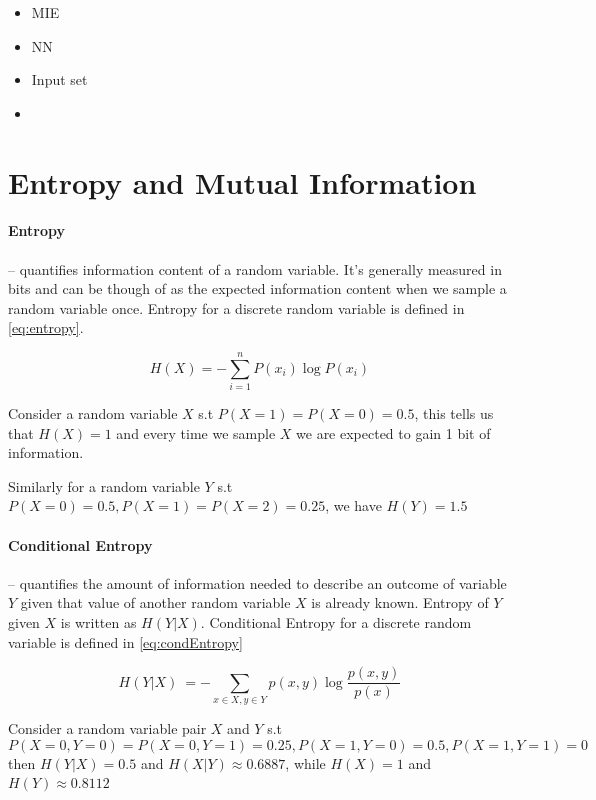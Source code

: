 
\begin{itemize}
  \item{
      MIE
    }
  \item{
      NN
    }
  \item{
      Input set 
    }
  \item{
    }
\end{itemize}

\section{Entropy and Mutual Information}

\paragraph{Entropy}-- quantifies information content of a random variable. It's
generally measured in bits and can be though of as the expected information
content when we sample a random variable once. Entropy for a discrete random
variable is defined in \autoref{eq:entropy}.

\begin{equation}
  H(X)=-\sum _{i=1}^{n}{P (x_{i})\log P(x_{i})}
\label{eq:entropy}
\end{equation}

Consider a random variable $X$ s.t $P(X=1) = P(X=0) = 0.5$, this tells
us that $H(X) = 1$ and every time we sample $X$ we are expected to gain 1 bit of
information.

Similarly for a random variable $Y$ s.t $P(X=0) = 0.5, P(X=1) = P(X=2) = 0.25$,
we have $H(Y) = 1.5$

\paragraph{Conditional Entropy}-- quantifies the amount of information needed to
describe an outcome of variable $Y$ given that value of another random variable
$X$ is already known. Entropy of $Y$ given $X$ is written as $H(Y|X)$.
Conditional Entropy for a discrete random variable is defined in
\autoref{eq:condEntropy}

\begin{equation}
H(Y|X)\ =-\sum _{x\in {X},y\in {Y}}p(x,y)\log {\frac {p(x,y)}{p(x)}}
\label{eq:condEntropy}
\end{equation}

Consider a random variable pair $X$ and $Y$ s.t 
$$P(X=0,Y=0) = P(X=0,Y=1) = 0.25, P(X=1,Y=0) = 0.5, P(X=1,Y=1) = 0$$
then $H(Y|X) = 0.5$ and $H(X|Y) \approx 0.6887$, while $H(X) = 1$ and $H(Y)
\approx 0.8112$

